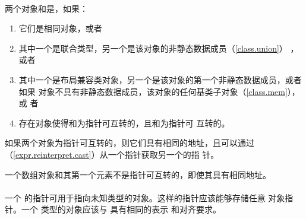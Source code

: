 \paragraph{} %
两个对象和是，如果：
\begin{enumerate}
  \item 它们是相同对象，或者
  \item 其中一个是联合类型，另一个是该对象的非静态数据成员（\ref{class.union}）
        ，或者
  \item 其中一个是布局兼容类对象，另一个是该对象的第一个非静态数据成员，或者如果
        对象不具有非静态数据成员，该对象的任何基类子对象（\ref{class.mem}），或
        者
  \item 存在对象使得和为指针可互转的，且和为指针可
        互转的。
\end{enumerate}
如果两个对象为指针可互转的，则它们具有相同的地址，且可以通过
（\ref{expr.reinterpret.cast}）从一个指针获取另一个的指
针。

\begin{note}
  一个数组对象和其第一个元素不是指针可互转的，即使其具有相同地址。
\end{note}

\paragraph{} %
一个 的指针可用于指向未知类型的对象。这样的指针应该能够存储任意
对象指针。一个 类型的对象应该与 具有相同的表示
和对齐要求。
